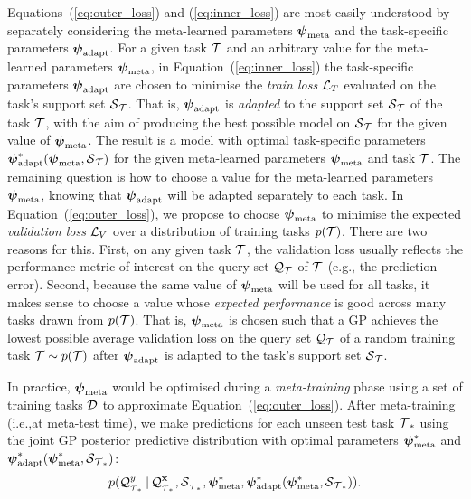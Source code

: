     Equations~(\ref{eq:outer_loss}) and (\ref{eq:inner_loss}) are most easily understood by separately considering the meta-learned parameters
    $\psimeta$ and the task-specific parameters $\psiml$.
    For a given task $\task$ and an arbitrary value for the meta-learned parameters $\psimeta$, in Equation~(\ref{eq:inner_loss}) the task-specific parameters $\psiml$ are chosen to minimise the \emph{train loss} $\loss_T$ evaluated on the task's support set $\support_{\task}$.
    That is, $\psiml$ is \emph{adapted} to the support set $\support_{\task}$ of the task $\task$,
    with the aim of producing the best possible model on $\support_{\task}$ for the given value of $\psimeta$.
    The result is a model with optimal task-specific parameters $\psiml^*(\psimeta,\support_{\task})$ for the given meta-learned parameters $\psimeta$ and task $\task$.
    The remaining question is how to choose a value for the meta-learned parameters $\psimeta$,
    knowing that $\psiml$ will be adapted separately to each task.
    In Equation~(\ref{eq:outer_loss}),
    we propose to choose $\psimeta$ to minimise the expected \emph{validation loss} $\loss_V$ over a distribution of training tasks $p(\task)$.
    There are two reasons for this.
    First, on any given task $\task$, the validation loss
    usually reflects the performance metric of interest on the query set $\query_{\task}$ of $\task$
    (e.g., the prediction error).
    Second, because the same value of $\psimeta$ will be used for all tasks,
    it makes sense to choose a value whose \emph{expected performance} is good across many tasks drawn from $p(\task)$.
    That is, $\psimeta$ is chosen such that a GP achieves the lowest possible average validation loss on the query
    set $\query_{\task}$ of a random training task $\task\sim p(\task)$ after $\psiml$ is adapted to the task's support set $\support_{\task}$.
    
    In practice, $\psimeta$ would be optimised during a \emph{meta-training} phase using a set of
    training tasks $\dataset$ to approximate Equation~(\ref{eq:outer_loss}).
    After meta-training
    (i.e.,\@ at meta-test time),
    we make predictions for each unseen test task $\task_*$ using the joint GP posterior predictive distribution with optimal parameters $\psimeta^*$ and $\psiml^*(\psimeta^*,\support_{\task_*})$:
    \begin{align}
        p(\query_{_{\task_*}}^y|\query_{_{\task_*}}^{\bfx},\support_{_{\task_*}},\psimeta^*,\psiml^*(\psimeta^*,\support_{\task_*} )).\label{eq:test_pred}
    \end{align}
    
